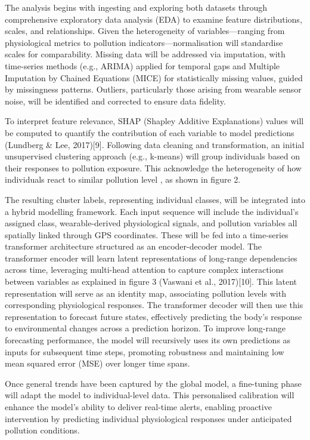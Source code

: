 \documentclass[
]{article}
\begin{document}
The analysis begins with ingesting and exploring both datasets through
comprehensive exploratory data analysis (EDA) to examine feature
distributions, scales, and relationships. Given the heterogeneity of
variables---ranging from physiological metrics to pollution
indicators---normalisation will standardise scales for comparability.
Missing data will be addressed via imputation, with time-series methods
(e.g., ARIMA) applied for temporal gaps and Multiple Imputation by
Chained Equations (MICE) for statistically missing values, guided by
missingness patterns. Outliers, particularly those arising from wearable
sensor noise, will be identified and corrected to ensure data fidelity.

To interpret feature relevance, SHAP (Shapley Additive Explanations)
values will be computed to quantify the contribution of each variable to
model predictions (Lundberg \& Lee, 2017){[}9{]}. Following data
cleaning and transformation, an initial unsupervised clustering approach
(e.g., k-means) will group individuals based on their responses to
pollution exposure. This acknowledge the heterogeneity of how
individuals react to similar pollution level , as shown in figure 2.

The resulting cluster labels, representing individual classes, will be
integrated into a hybrid modelling framework. Each input sequence will
include the individual's assigned class, wearable-derived physiological
signals, and pollution variables all spatially linked through GPS
coordinates. These will be fed into a time-series transformer
architecture structured as an encoder-decoder model. The transformer
encoder will learn latent representations of long-range dependencies
across time, leveraging multi-head attention to capture complex
interactions between variables as explained in figure 3 (Vaswani et al.,
2017){[}10{]}. This latent representation will serve as an identity map,
associating pollution levels with corresponding physiological responses.
The transformer decoder will then use this representation to forecast
future states, effectively predicting the body's response to
environmental changes across a prediction horizon. To improve long-range
forecasting performance, the model will recursively uses its own
predictions as inputs for subsequent time steps, promoting robustness
and maintaining low mean squared error (MSE) over longer time spans.

Once general trends have been captured by the global model, a
fine-tuning phase will adapt the model to individual-level data. This
personalised calibration will enhance the model's ability to deliver
real-time alerts, enabling proactive intervention by predicting
individual physiological responses under anticipated pollution
conditions.
\end{document}
